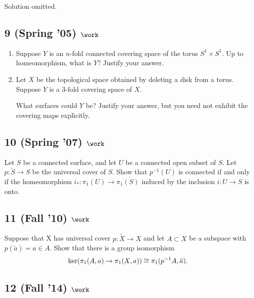 Solution omitted.

\hypertarget{spring-05-work}{%
\subsection{\texorpdfstring{9 (Spring '05)
\(\work\)}{9 (Spring '05) \textbackslash work}}\label{spring-05-work}}

\begin{enumerate}
\def\labelenumi{\alph{enumi}.}
\item
  Suppose \(Y\) is an \(n\)-fold connected covering space of the torus
  \(S^1 \times S^1\). Up to homeomorphism, what is \(Y\)? Justify your
  answer.
\item
  Let \(X\) be the topological space obtained by deleting a disk from a
  torus. Suppose \(Y\) is a 3-fold covering space of \(X\).

  What surfaces could \(Y\) be? Justify your answer, but you need not
  exhibit the covering maps explicitly.
\end{enumerate}

\hypertarget{spring-07-work}{%
\subsection{\texorpdfstring{10 (Spring '07)
\(\work\)}{10 (Spring '07) \textbackslash work}}\label{spring-07-work}}

Let \(S\) be a connected surface, and let \(U\) be a connected open
subset of \(S\). Let \(p : \tilde S \to S\) be the universal cover of
\(S\). Show that \(p^{-1}(U )\) is connected if and only if the
homeomorphism \(i_\ast : \pi_1 (U ) \to \pi_1 (S)\) induced by the
inclusion \(i : U \to S\) is onto.

\hypertarget{fall-10-work}{%
\subsection{\texorpdfstring{11 (Fall '10)
\(\work\)}{11 (Fall '10) \textbackslash work}}\label{fall-10-work}}

Suppose that X has universal cover \(p : \tilde X \to X\) and let
\(A \subset X\) be a subspace with \(p(\tilde a) = a \in A\). Show that
there is a group isomorphism
\begin{align*}
\ker(\pi_1 (A, a) \to \pi_1 (X, a)) \cong \pi_1 (p^{-1}A, \mkern 1.5mu\overline{\mkern-1.5mua\mkern-1.5mu}\mkern 1.5mu)
.\end{align*}

\hypertarget{fall-14-work-2}{%
\subsection{\texorpdfstring{12 (Fall '14)
\(\work\)}{12 (Fall '14) \textbackslash work}}\label{fall-14-work-2}}

